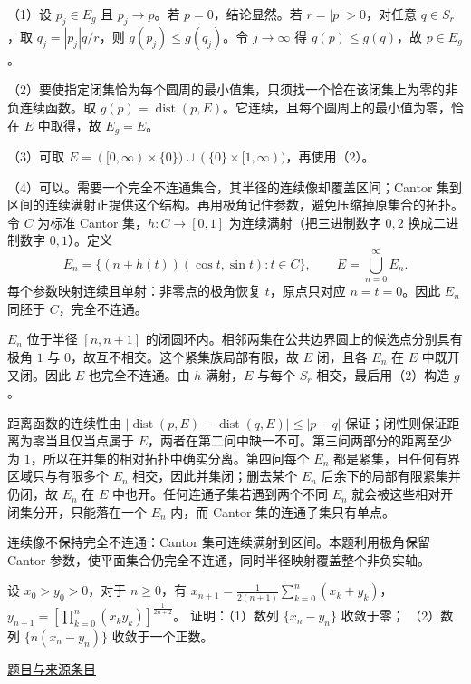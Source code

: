 \documentclass[UTF8,12pt,a4paper,fontset=fandol]{ctexart}
\begin{document}
\begin{solve}\label{ans:fin16-high:8}

（1）设 $p_j\in E_g$ 且 $p_j\to p$。若 $p=0$，结论显然。若 $r=|p|>0$，对任意 $q\in S_r$，取 $q_j=|p_j|q/r$，则 $g(p_j)\le g(q_j)$。令 $j\to\infty$ 得 $g(p)\le g(q)$，故 $p\in E_g$。

（2）要使指定闭集恰为每个圆周的最小值集，只须找一个恰在该闭集上为零的非负连续函数。取 $g(p)=\operatorname{dist}(p,E)$。它连续，且每个圆周上的最小值为零，恰在 $E$ 中取得，故 $E_g=E$。

（3）可取 $E=([0,\infty)\times\{0\})\cup(\{0\}\times[1,\infty))$，再使用（2）。

（4）可以。需要一个完全不连通集合，其半径的连续像却覆盖区间；Cantor 集到区间的连续满射正提供这个结构。再用极角记住参数，避免压缩掉原集合的拓扑。令 $C$ 为标准 Cantor 集，$h:C\to[0,1]$ 为连续满射（把三进制数字 $0,2$ 换成二进制数字 $0,1$）。定义
\[
E_n=\{(n+h(t))(\cos t,\sin t):t\in C\},\qquad E=\bigcup_{n=0}^\infty E_n.
\]
每个参数映射连续且单射：非零点的极角恢复 $t$，原点只对应 $n=t=0$。因此 $E_n$ 同胚于 $C$，完全不连通。

$E_n$ 位于半径 $[n,n+1]$ 的闭圆环内。相邻两集在公共边界圆上的候选点分别具有极角 $1$ 与 $0$，故互不相交。这个紧集族局部有限，故 $E$ 闭，且各 $E_n$ 在 $E$ 中既开又闭。因此 $E$ 也完全不连通。由 $h$ 满射，$E$ 与每个 $S_r$ 相交，最后用（2）构造 $g$。

距离函数的连续性由 $|\operatorname{dist}(p,E)-\operatorname{dist}(q,E)|\le|p-q|$ 保证；闭性则保证距离为零当且仅当点属于 $E$，两者在第二问中缺一不可。第三问两部分的距离至少为 $1$，所以在并集的相对拓扑中确实分离。第四问每个 $E_n$ 都是紧集，且任何有界区域只与有限多个 $E_n$ 相交，因此并集闭；删去某个 $E_n$ 后余下的局部有限紧集并仍闭，故 $E_n$ 在 $E$ 中也开。任何连通子集若遇到两个不同 $E_n$ 就会被这些相对开闭集分开，只能落在一个 $E_n$ 内，而 Cantor 集的连通子集只有单点。

\end{solve}

\begin{remark}[方法与条件]连续像不保持完全不连通：Cantor 集可连续满射到区间。本题利用极角保留 Cantor 参数，使平面集合仍完全不连通，同时半径映射覆盖整个非负实轴。\end{remark}

\begin{example}\label{ex:fin16-low:9}\label{pr:fin16-low:9}

设 $x_0 > y_0 > 0$，对于 $n \geq 0$，有
$x_{n+1} = \frac{1}{2(n+1)} \sum_{k=0}^{n} (x_k + y_k)$，$y_{n+1} = \left[ \prod_{k=0}^{n} (x_k y_k) \right]^{\frac{1}{2n+2}}$。
证明：（1）数列 $\{x_n - y_n\}$ 收敛于零；
（2）数列 $\{n(x_n - y_n)\}$ 收敛于一个正数。

\par\href{https://github.com/lzxcr/cmc-mathematics/blob/64916fa1fdbc3e444a652eca204d5669058ee321/src/problems/finals/16/10.md}{题目与来源条目}

\end{example}
\end{document}
